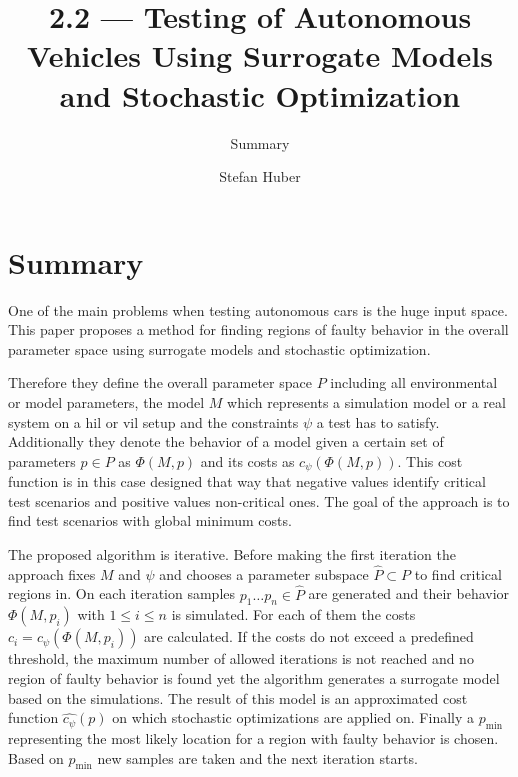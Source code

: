 \documentclass[oneside, notitlepage, twocolumn]{scrartcl}
\title{\LARGE 2.2 --- Testing of Autonomous Vehicles Using Surrogate Models and Stochastic Optimization}
\subtitle{Summary}
\author{Stefan Huber}
\begin{document}
\maketitle

\section{Summary}
One of the main problems when testing autonomous cars is the huge input space.
This paper proposes a method for finding regions of faulty behavior in the overall parameter space using surrogate models and stochastic optimization.\par
Therefore they define the overall parameter space \(P\) including all environmental or model parameters, the model \(M\) which represents a simulation model or a real system on a \gls{hil} or \gls{vil} setup and the constraints \(\psi\) a test has to satisfy.
Additionally they denote the behavior of a model given a certain set of parameters \(p\in P\) as \(\Phi (M, p)\) and its costs as \(c_\psi(\Phi(M, p))\).
This cost function is in this case designed that way that negative values identify critical test scenarios and positive values non-critical ones.
The goal of the approach is to find test scenarios with global minimum costs.\par
The proposed algorithm is iterative.
Before making the first iteration the approach fixes \(M\) and \(\psi\) and chooses a parameter subspace \(\hat{P}\subset P\) to find critical regions in.
On each iteration samples \(p_1\ldots p_n\in \hat{P}\) are generated and their behavior \(\Phi (M, p_i)\) with \(1 \leq i \leq n\) is simulated.
For each of them the costs \(c_i=c_\psi(\Phi(M, p_i))\) are calculated.
If the costs do not exceed a predefined threshold, the maximum number of allowed iterations is not reached and no region of faulty behavior is found yet the algorithm generates a surrogate model based on the simulations.
The result of this model is an approximated cost function \(\hat{c_\psi}(p)\) on which stochastic optimizations are applied on.
Finally a \(p_\min\) representing the most likely location for a region with faulty behavior is chosen.
Based on \(p_\min\) new samples are taken and the next iteration starts.
\end{document}
